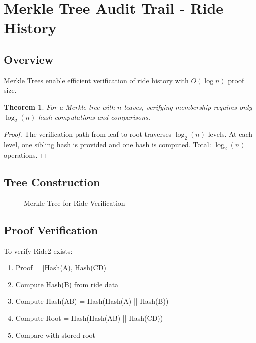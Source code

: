 \documentclass[12pt]{report}
\theoremstyle{plain}
\newtheorem{theorem}{Theorem}[section]
\theoremstyle{definition}
\theoremstyle{remark}
\begin{document}
\section{Merkle Tree Audit Trail - Ride History}

\subsection{Overview}

Merkle Trees enable efficient verification of ride history with $O(\log n)$ proof size.

\begin{theorem}
For a Merkle tree with $n$ leaves, verifying membership requires only $\log_2(n)$ hash computations and comparisons.
\end{theorem}

\begin{proof}
The verification path from leaf to root traverses $\log_2(n)$ levels. At each level, one sibling hash is provided and one hash is computed. Total: $\log_2(n)$ operations.
\end{proof}

\subsection{Tree Construction}

\begin{figure}[H]
\centering
{}
\caption{Merkle Tree for Ride Verification}
\end{figure}

\subsection{Proof Verification}

To verify Ride2 exists:
\begin{enumerate}
    \item Proof = [Hash(A), Hash(CD)]
    \item Compute Hash(B) from ride data
    \item Compute Hash(AB) = Hash(Hash(A) || Hash(B))
    \item Compute Root = Hash(Hash(AB) || Hash(CD))
    \item Compare with stored root
\end{enumerate}
\end{document}
